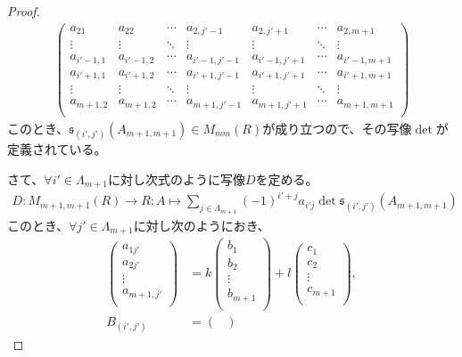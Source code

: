 \documentclass[dvipdfmx]{jsarticle}
\begin{document}
\begin{proof}
\begin{align*}
\begin{pmatrix}
a_{21} & a_{22} & \cdots & a_{2,j' - 1} & a_{2,j' + 1} & \cdots & a_{2,m + 1} \\
 \vdots & \vdots & \ddots & \vdots & \vdots & \ddots & \vdots \\
a_{i' - 1,1} & a_{i' - 1,2} & \cdots & a_{i' - 1,j' - 1} & a_{i' - 1,j' + 1} & \cdots & a_{i' - 1,m + 1} \\
a_{i' + 1,1} & a_{i' + 1,2} & \cdots & a_{i' + 1,j' - 1} & a_{i' + 1,j' + 1} & \cdots & a_{i' + 1,m + 1} \\
 \vdots & \vdots & \ddots & \vdots & \vdots & \ddots & \vdots \\
a_{m + 1,2} & a_{m + 1,2} & \cdots & a_{m + 1,j' - 1} & a_{m + 1,j' + 1} & \cdots & a_{m + 1,m + 1} \\
\end{pmatrix}
\end{align*}
このとき、$\mathfrak{s}_{\left( i',j' \right)}\left( A_{m + 1,m + 1} \right) \in M_{mm}(R)$が成り立つので、その写像$\det$が定義されている。\par
さて、$\forall i' \in \varLambda_{m + 1}$に対し次式のように写像$D$を定める。
\begin{align*}
D:M_{m + 1,m + 1}(R) \rightarrow R;A \mapsto \sum_{j \in \varLambda_{m + 1}} {( - 1)^{i' + j}a_{i'j}\det{\mathfrak{s}_{\left( i',j' \right)}\left( A_{m + 1,m + 1} \right)}}
\end{align*}
このとき、$\forall j' \in \varLambda_{m + 1}$に対し次のようにおき、
\begin{align*}
\begin{pmatrix}
a_{1j'} \\
a_{2j'} \\
 \vdots \\
a_{m + 1,j'} \\
\end{pmatrix} &= k\begin{pmatrix}
b_{1} \\
b_{2} \\
 \vdots \\
b_{m + 1} \\
\end{pmatrix} + l\begin{pmatrix}
c_{1} \\
c_{2} \\
 \vdots \\
c_{m + 1} \\
\end{pmatrix},\\
B_{\left( i',j' \right)} &= \begin{pmatrix}

\end{pmatrix}
\end{align*}
\end{proof}
\end{document}
